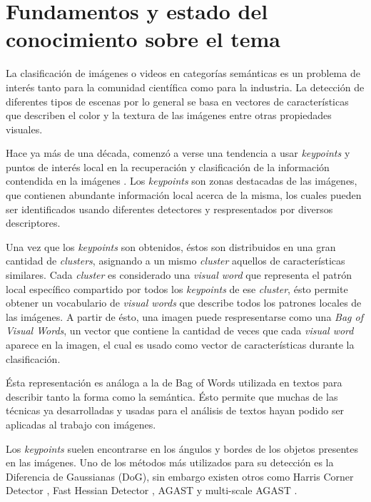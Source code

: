 \section{Fundamentos y estado del conocimiento sobre el tema}
\iffalse
Escriba una breve introducción general al tema y cite y comente las mayores
contribuciones en el tema específico, incluyendo bibliografıa actualizada.
\fi
La clasificación de imágenes o videos en categorías semánticas es un problema de interés tanto para la comunidad científica como
para la industria. La detección de diferentes tipos de escenas por lo general se basa en vectores de características que describen
el color y la textura de las imágenes entre otras propiedades visuales.

Hace ya más de una década, comenzó a verse una tendencia a usar \textit{keypoints} y puntos de interés local en la recuperación y
clasificación de la información contendida en la imágenes \parencite{csurka2004visual, lopes2010action}. Los \textit{keypoints} son zonas destacadas de las imágenes, que contienen
abundante información local acerca de la misma, los cuales pueden ser identificados usando diferentes detectores y respresentados
por diversos descriptores.

Una vez que los \textit{keypoints} son obtenidos, éstos son distribuidos en una gran cantidad de \textit{clusters}, asignando a un mismo
\textit{cluster} aquellos de características similares. Cada \textit{cluster} es considerado una \textit{visual word}
que representa el patrón local específico compartido por todos los \textit{keypoints} de ese \textit{cluster}, ésto permite obtener un
vocabulario de \textit{visual words} que describe todos los patrones locales de las imágenes. A partir
de ésto, una imagen puede respresentarse como una \textit{Bag of Visual Words}, un vector que contiene
la cantidad de veces que cada \textit{visual word} aparece en la imagen, el cual es usado como vector
de características durante la clasificación.

Ésta representación es análoga a la de Bag of Words utilizada en textos para describir tanto la forma
como la semántica. Ésto permite que muchas de las técnicas ya desarrolladas y usadas para el análisis de textos hayan podido ser aplicadas
al trabajo con imágenes.

Los \textit{keypoints} suelen encontrarse en los ángulos y bordes de los objetos presentes en las imágenes.
Uno de los métodos más utilizados para su detección es la Diferencia de Gaussianas (DoG), sin embargo existen otros como
Harris Corner Detector \parencite{harris1988combined}, Fast Hessian Detector \parencite{bay2006surf}, AGAST \parencite{mair2010adaptive} y
multi-scale AGAST \parencite{leutenegger2011brisk}. 

